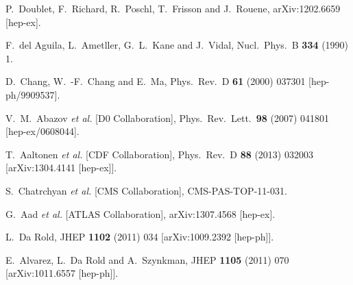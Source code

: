 \documentclass[12pt,a4paper]{article}
\begin{document}
\begin{thebibliography}{99}
  P.~Doublet, F.~Richard, R.~Poschl, T.~Frisson and J.~Rouene,
  arXiv:1202.6659 [hep-ex].

  F.~del Aguila, L.~Ametller, G.~L.~Kane and J.~Vidal,
  Nucl.\ Phys.\ B {\bf 334} (1990) 1.

  D.~Chang, W.~-F.~Chang and E.~Ma,
  Phys.\ Rev.\ D {\bf 61} (2000) 037301
  [hep-ph/9909537].

  V.~M.~Abazov {\it et al.}  [D0 Collaboration],
  Phys.\ Rev.\ Lett.\  {\bf 98} (2007) 041801
  [hep-ex/0608044].

 
  T.~Aaltonen {\it et al.}  [CDF Collaboration],
  Phys.\ Rev.\ D {\bf 88} (2013) 032003
  [arXiv:1304.4141 [hep-ex]].
  
  
 S.~Chatrchyan {\it et al.}   [CMS Collaboration],
  CMS-PAS-TOP-11-031.


  G.~Aad {\it et al.}  [ATLAS Collaboration],
  arXiv:1307.4568 [hep-ex].



  L.~Da Rold,
  JHEP {\bf 1102} (2011) 034
  [arXiv:1009.2392 [hep-ph]].

  E.~Alvarez, L.~Da Rold and A.~Szynkman,
  JHEP {\bf 1105} (2011) 070
  [arXiv:1011.6557 [hep-ph]].


\end{thebibliography}
\end{document}
